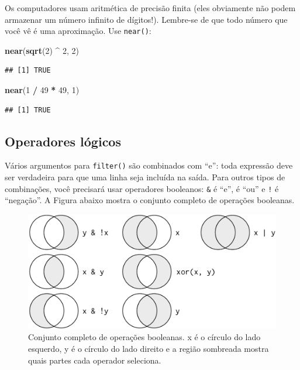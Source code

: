 \documentclass[]{book}
\newenvironment{Shaded}{\begin{snugshade}}{\end{snugshade}}
\newcommand{\DecValTok}[1]{\textcolor[rgb]{0.00,0.00,0.81}{#1}}
\newcommand{\KeywordTok}[1]{\textcolor[rgb]{0.13,0.29,0.53}{\textbf{#1}}}
\newcommand{\NormalTok}[1]{#1}
\newcommand{\OperatorTok}[1]{\textcolor[rgb]{0.81,0.36,0.00}{\textbf{#1}}}
\newcommand{\StringTok}[1]{\textcolor[rgb]{0.31,0.60,0.02}{#1}}
\begin{document}
Os computadores usam aritmética de precisão finita (eles obviamente não podem armazenar um número infinito de dígitos!). Lembre-se de que todo número que você vê é uma aproximação. Use \texttt{near()}:

\begin{Shaded}
\begin{Highlighting}[]
\KeywordTok{near}\NormalTok{(}\KeywordTok{sqrt}\NormalTok{(}\DecValTok{2}\NormalTok{) }\OperatorTok{^}\StringTok{ }\DecValTok{2}\NormalTok{,  }\DecValTok{2}\NormalTok{)}
\end{Highlighting}
\end{Shaded}

\begin{verbatim}
## [1] TRUE
\end{verbatim}

\begin{Shaded}
\begin{Highlighting}[]
\KeywordTok{near}\NormalTok{(}\DecValTok{1} \OperatorTok{/}\StringTok{ }\DecValTok{49} \OperatorTok{*}\StringTok{ }\DecValTok{49}\NormalTok{, }\DecValTok{1}\NormalTok{)}
\end{Highlighting}
\end{Shaded}

\begin{verbatim}
## [1] TRUE
\end{verbatim}

\hypertarget{operadores-luxf3gicos}{%
\subsection{Operadores lógicos}\label{operadores-luxf3gicos}}

Vários argumentos para \texttt{filter()} são combinados com ``e'': toda expressão deve ser verdadeira para que uma linha seja incluída na saída. Para outros tipos de combinações, você precisará usar operadores booleanos: \texttt{\&} é ``e'', \texttt{\textbar{}} é ``ou'' e \texttt{!} é ``negação''. A Figura abaixo mostra o conjunto completo de operações booleanas.

\begin{figure}

{\centering \includegraphics[width=0.7\linewidth]{imagens/transform-logical} 

}

\caption{Conjunto completo de operações booleanas. x é o círculo do lado esquerdo, y é o círculo do lado direito e a região sombreada mostra quais partes cada operador seleciona.}\label{fig:unnamed-chunk-48}
\end{figure}
\end{document}
